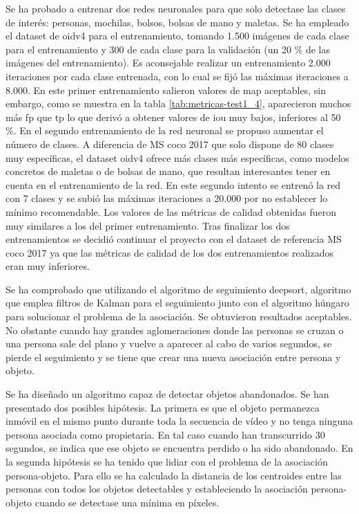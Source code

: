Se ha probado a entrenar dos redes neuronales para que solo detectase las clases de interés: personas, mochilas, bolsos, bolsas de mano y maletas. Se ha empleado el dataset de \gls{oidv4} para el entrenamiento, tomando 1.500 imágenes de cada clase para el entrenamiento y 300 de cada clase para la validación (un 20 \% de las imágenes del entrenamiento). Es aconsejable realizar un entrenamiento 2.000 iteraciones por cada clase entrenada, con lo cual se fijó las máximas iteraciones a 8.000. En este primer entrenamiento salieron valores de \gls{map} aceptables, sin embargo, como se muestra en la tabla \ref{tab:metricas-test1_4}, aparecieron muchos más \gls{fp} que \gls{tp} lo que derivó a obtener valores de \gls{iou} muy bajos, inferiores al 50 \%. En el segundo entrenamiento de la red neuronal se propuso aumentar el número de clases. A diferencia de MS \gls{coco} 2017 que solo dispone de 80 clases muy específicas, el dataset \gls{oidv4} ofrece más clases más específicas, como modelos concretos de maletas o de bolsas de mano, que resultan interesantes tener en cuenta en el entrenamiento de la red. En este segundo intento se entrenó la red con 7 clases y se subió las máximas iteraciones a 20.000 por no establecer lo mínimo recomendable. Los valores de las métricas de calidad obtenidas fueron muy similares a los del primer entrenamiento. Tras finalizar los dos entrenamientos se decidió continuar el proyecto con el dataset de referencia MS \gls{coco} 2017 ya que las métricas de calidad de los dos entrenamientos realizados eran muy inferiores.

Se ha comprobado que utilizando el algoritmo de seguimiento \gls{deepsort}, algoritmo que emplea filtros de Kalman para el seguimiento junto con el algoritmo húngaro para solucionar el problema de la asociación. Se obtuvieron resultados aceptables. No obstante cuando hay grandes aglomeraciones donde las personas se cruzan o una persona sale del plano y vuelve a aparecer al cabo de varios segundos, se pierde el seguimiento y se tiene que crear una nueva asociación entre persona y objeto.

Se ha diseñado un algoritmo capaz de detectar objetos abandonados. Se han presentado dos posibles hipótesis. La primera es que el objeto permanezca inmóvil en el mismo punto durante toda la secuencia de vídeo y no tenga ninguna persona asociada como propietaria. En tal caso cuando han transcurrido 30 segundos, se indica que ese objeto se encuentra perdido o ha sido abandonado. En la segunda hipótesis se ha tenido que lidiar con el problema de la asociación persona-objeto. Para ello se ha calculado la distancia de los centroides entre las personas con todos los objetos detectables y estableciendo la asociación persona-objeto cuando se detectase una mínima en píxeles. 

